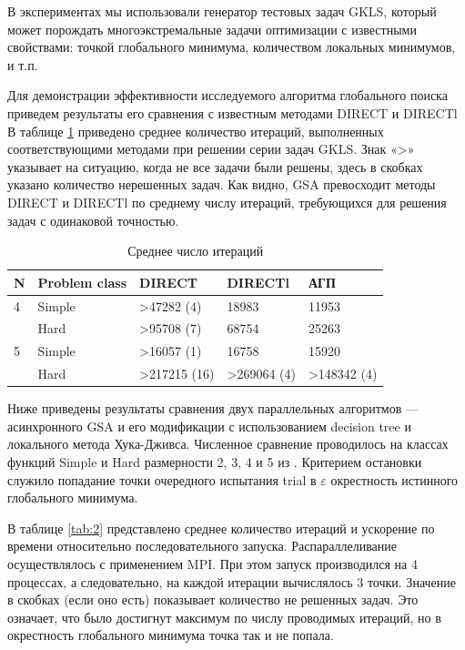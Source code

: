 \documentclass{svproc}
\begin{document}
В экспериментах мы использовали генератор тестовых задач GKLS, который может порождать многоэкстремальные задачи оптимизации с известными свойствами: точкой глобального минимума, количеством локальных минимумов, и т.п.

Для демонстрации эффективности исследуемого алгоритма глобального поиска приведем результаты его сравнения с известным методами DIRECT и DIRECTl
В таблице \ref{tab:1} приведено среднее количество итераций, выполненных соответствующими методами при решении серии задач GKLS. Знак «>» указывает на ситуацию, когда не все задачи были решены, здесь в скобках указано количество нерешенных задач. Как видно, GSA превосходит методы DIRECT и DIRECTl по среднему числу итераций, требующихся для решения задач с одинаковой точностью.

\begin{table}[!ht]
    \caption{Среднее число итераций}
    \label{tab:1}
    \centering
    \begin{tabular}{|l|l|l|l|l|}
    \hline
        N & Problem class & DIRECT & DIRECTl & АГП  \\ \hline
        4 & Simple & >47282 (4) & 18983 & 11953  \\ \hline
        ~ & Hard & >95708 (7) & 68754 & 25263  \\ \hline
        5 & Simple & >16057 (1) & 16758 & 15920  \\ \hline
        ~ & Hard & >217215 (16) & >269064 (4) & >148342 (4)  \\ \hline
    \end{tabular}
\end{table}


Ниже приведены результаты сравнения двух параллельных алгоритмов --- асинхронного GSA и его модификации с использованием decision tree и локального метода Хука-Дживса. Численное сравнение проводилось на классах функций Simple и Hard размерности 2, 3, 4 и 5 из \cite{fio_bib19}. Критерием остановки служило попадание точки очередного испытания trial в $\varepsilon$ окрестность истинного глобального минимума. 

В таблице \ref{tab:2} представлено среднее количество итераций и ускорение по времени относительно последовательного запуска. Распараллеливание  осуществлялось с применением  MPI. При этом запуск производился на 4 процессах, а следовательно, на каждой итерации вычислялось 3 точки. Значение в скобках (если оно есть) показывает количество не решенных задач. Это означает, что было достигнут максимум по числу проводимых итераций, но в окрестность глобального минимума точка так и не попала.
\end{document}
